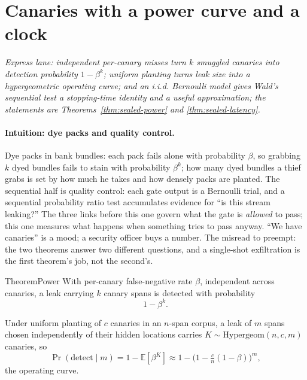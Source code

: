 \documentclass[11pt,a4paper]{article}
\theoremstyle{definition}
\begin{document}
\section{Canaries with a power curve and a clock}\label{sec:sealed-detection}

\noindent\emph{Express lane: independent per-canary misses turn $k$ smuggled
canaries into detection probability $1-\beta^k$; uniform planting turns leak
size into a hypergeometric operating curve; and an i.i.d. Bernoulli model gives
Wald's sequential test a stopping-time identity and a useful approximation;
the statements are Theorems~\ref{thm:sealed-power} and \ref{thm:sealed-latency}.}

\paragraph{Intuition: dye packs and quality control.}
Dye packs in bank bundles: each pack fails alone with probability $\beta$, so
grabbing $k$ dyed bundles fails to stain with probability $\beta^k$; how many
dyed bundles a thief grabs is set by how much he takes and how densely packs
are planted. The sequential half is quality control: each gate output is a
Bernoulli trial, and a sequential probability ratio test accumulates evidence
for ``is this stream leaking?'' The three links before this one
govern what the gate is \emph{allowed} to pass; this one measures what happens
when something tries to pass anyway. ``We have canaries'' is a mood; a security
officer buys a number. The misread to preempt: the two theorems answer two
different questions, and a single-shot exfiltration is the first theorem's job,
not the second's.

\begin{pdclaim}{Theorem}{Power}
\setlength{\parskip}{4pt plus 1pt}
\label{thm:sealed-power}
With per-canary false-negative rate $\beta$, independent across canaries, a
leak carrying $k$ canary spans is detected with probability
\[
1-\beta^k.
\]

Under uniform planting of $c$ canaries in an $n$-span corpus, a leak of $m$ spans
chosen independently of their hidden locations
carries $K\sim\mathrm{Hypergeom}(n,c,m)$ canaries, so
\[
\Pr(\text{detect}\mid m)=1-\mathbb{E}[\beta^K]\approx
1-\bigl(1-\tfrac{c}{n}(1-\beta)\bigr)^m,
\]
the operating curve.
\end{pdclaim}
\end{document}
